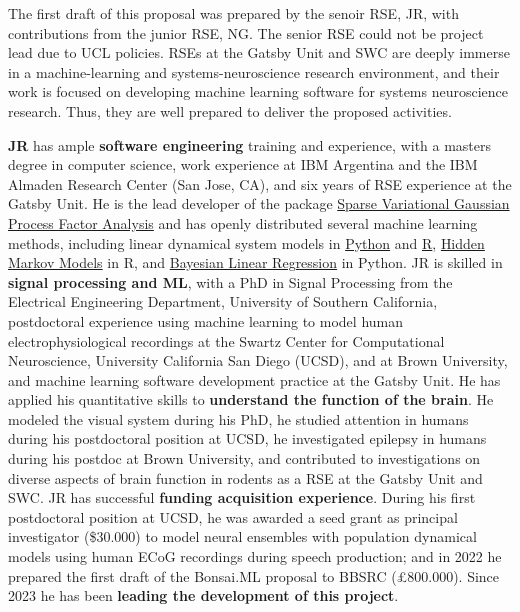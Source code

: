 The first draft of this proposal was prepared by the senoir RSE, JR, with
contributions from the junior RSE, NG. The senior RSE could not be project lead
due to UCL policies.
%
RSEs at the Gatsby Unit and SWC are deeply immerse in a machine-learning and
systems-neuroscience research environment, and their work is focused on
developing machine learning software for systems neuroscience research.
%
Thus, they are well prepared to deliver the proposed activities.

\textbf{JR} has ample \textbf{software engineering} training and experience, with a
masters degree in computer science, work experience at IBM Argentina and the
IBM Almaden Research Center (San Jose, CA), and six years of RSE experience at
the Gatsby Unit.
%
He is the lead developer of the package
\href{https://github.com/joacorapela/svGPFA}{Sparse Variational Gaussian
Process Factor Analysis} and has openly distributed several machine learning
methods, including linear dynamical system models in
\href{https://github.com/joacorapela/ssm}{Python} and
\href{https://github.com/joacorapela/kalmanFilter}{R},
\href{https://github.com/joacorapela/hiddenMarkovModels}{Hidden Markov Models}
in R, and
\href{https://github.com/joacorapela/bayesianLinearRegression}{Bayesian Linear
Regression} in Python.
%
JR is skilled in \textbf{signal processing and ML}, with a PhD in Signal Processing from
the Electrical Engineering Department, University of Southern California,
postdoctoral experience using machine learning to model human
electrophysiological recordings at the Swartz Center for Computational
Neuroscience, University California San Diego (UCSD), and at Brown University, and
machine learning software development practice at the Gatsby Unit.
%
He has applied his quantitative skills to \textbf{understand the function of
the brain}. He modeled the visual system during his PhD, he studied attention in humans
during his postdoctoral position at UCSD, he investigated epilepsy in humans during his postdoc
at Brown University, and contributed to investigations on diverse aspects of brain function in rodents as a RSE
at the Gatsby Unit and SWC.
%
JR has successful \textbf{funding acquisition experience}. During his first
postdoctoral position at UCSD, he was awarded a seed
grant as principal investigator (\$30.000) to model neural ensembles with population dynamical models
using human ECoG recordings during speech production; and in 2022 he prepared
the first draft of the Bonsai.ML proposal to BBSRC (\pounds 800.000).
%
Since 2023 he has been \textbf{leading the development of this project}.



